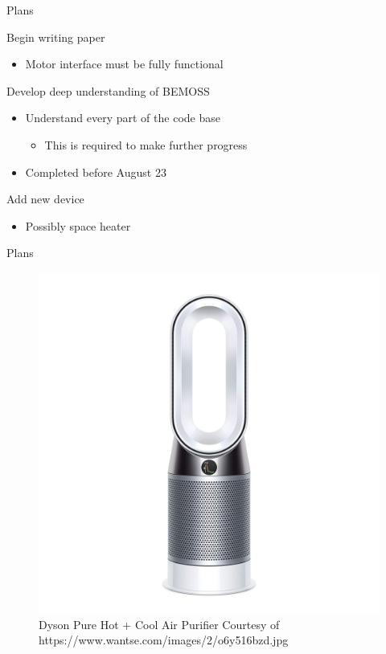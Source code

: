 \documentclass{beamer}
\begin{document}
\begin{frame}{Plans}
\begin{block}{Begin writing paper}
\begin{itemize}
	\item Motor interface must be fully functional
\end{itemize}
\end{block}
\begin{block}{Develop deep understanding of BEMOSS}
	\begin{itemize}
		\item Understand every part of the code base
		\begin{itemize}
			\item This is required to make further progress
		\end{itemize}
		\item Completed before August 23
	\end{itemize}
\end{block}
\begin{block}{Add new device}
\begin{itemize}
\item Possibly space heater
\end{itemize}
\end{block}
\end{frame}
\begin{frame}{Plans}
\begin{figure}
	\centering
	\includegraphics[scale=0.11]{figs/dysonairpurifier.jpg}
	\caption{Dyson Pure Hot + Cool Air Purifier Courtesy of https://www.wantse.com/images/2/o6y516bzd.jpg}
\end{figure}
\end{frame}
\end{document}
